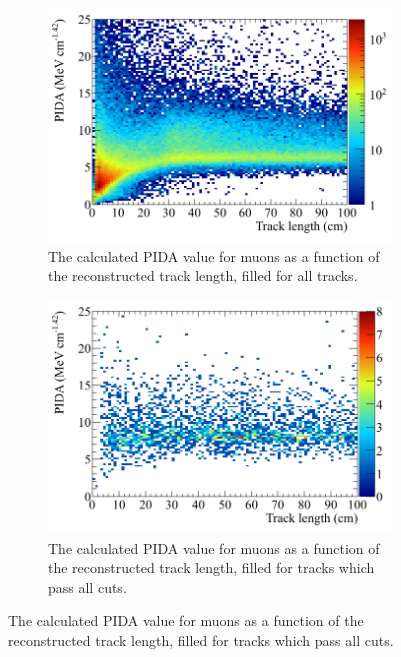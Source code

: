 \begin{figure}
\begin{subfigure}{0.48\textwidth}
        \label{fig:CRY_PIDATrLen_Proton_End}
  \end{subfigure}
  \begin{subfigure}{0.48\textwidth}
        \centering
        \includegraphics[width=\textwidth]{ProtonEnrich_500V_v05_14_00_trackpmtrackdc_Muon_All_PIDA_TrackLen}
        \caption{The calculated PIDA value for muons as a function of the reconstructed track length, filled for all tracks.}
        \label{fig:CRY_PIDATrLen_Muon_All}
  \end{subfigure}%
  \hspace{0.03\textwidth}%
  \begin{subfigure}{0.48\textwidth}
        \centering
        \includegraphics[width=\textwidth]{ProtonEnrich_500V_v05_14_00_trackpmtrackdc_Muon_End_PIDA_TrackLen}
        \caption{The calculated PIDA value for muons as a function of the reconstructed track length, filled for tracks which pass all cuts.}

\end{subfigure}
\end{figure}
